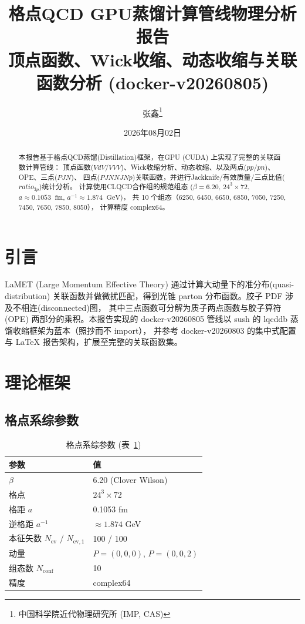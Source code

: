 \documentclass[11pt,a4paper]{article}
\title{\textbf{格点QCD GPU蒸馏计算管线物理分析报告}\\[0.3em]
       \large 顶点函数、Wick收缩、动态收缩与关联函数分析 (docker-v20260805)}
\author{张鑫\thanks{中国科学院近代物理研究所 (IMP, CAS)}}
\date{2026年08月02日}
\newcommand{\gev}{\;\mathrm{GeV}}
\newcommand{\fm}{\;\mathrm{fm}}
\newcommand{\Nconf}{N_{\mathrm{conf}}}
\newcommand{\Nev}{N_{\mathrm{ev}}}
\newcommand{\apm}{a^{-1}}
\begin{document}
\maketitle

\begin{abstract}
本报告基于格点QCD蒸馏(Distillation)框架，在GPU (CUDA) 上实现了完整的关联函数计算管线：
顶点函数($VdV$/$VVV$)、Wick收缩分析、动态收缩、以及两点($pp$/$pn$)、OPE、三点($PJN$)、
四点($PJNNJNp$)关联函数，并进行Jackknife/有效质量/三点比值($ratio_{3p}$)统计分析。
计算使用CLQCD合作组的规范组态
($\beta=6.20$, $24^3\times72$, $a\approx0.1053\;\fm$, $\apm\approx1.874\;\gev$)，
共 10 个组态（6250, 6450, 6650, 6850, 7050, 7250, 7450, 7650, 7850, 8050），
计算精度 complex64。
\end{abstract}

\tableofcontents
\newpage

\section{引言}
LaMET (Large Momentum Effective Theory) 通过计算大动量下的准分布(quasi-distribution)
关联函数并做微扰匹配，得到光锥 parton 分布函数。胶子 PDF 涉及不相连(disconnected)图，
其中三点函数可分解为质子两点函数与胶子算符 (OPE) 两部分的乘积。本报告实现的
docker-v20260805 管线以 sush 的 lqcddb 蒸馏收缩框架为蓝本（照抄而不 import），
并参考 docker-v20260803 的集中式配置与 LaTeX 报告架构，扩展至完整的关联函数集。

\section{理论框架}
\subsection{格点系综参数}
\begin{table}[h]
\centering
\caption{格点系综参数 (表~\ref{tab:ensemble})}
\label{tab:ensemble}
\begin{tabular}{ll}
\toprule
参数 & 值 \\
\midrule
$\beta$ & 6.20 (Clover Wilson) \\
格点 & $24^3\times72$ \\
格距 $a$ & 0.1053 fm \\
逆格距 $\apm$ & $\approx 1.874$ GeV \\
本征矢数 $\Nev$ / $N_{\mathrm{ev,1}}$ & 100 / 100 \\
动量 & $P=(0,0,0)$, $P=(0,0,2)$ \\
组态数 $\Nconf$ & 10 \\
精度 & complex64 \\
\bottomrule
\end{tabular}
\end{table}
\end{document}
